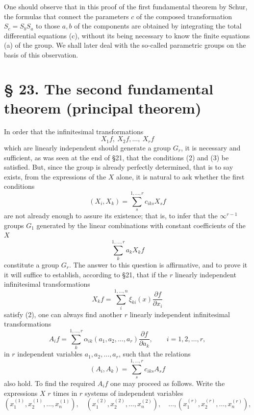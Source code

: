 \documentclass[11pt]{book}
\begin{document}
One should observe that in this proof of the first fundamental theorem by Schur, the formulas that connect the parameters $c$ of the composed transformation $S_c=S_bS_a$ to those $a,b$ of the components are obtained by integrating the total differential equations (c), without its being necessary to know the finite equations (a) of the group. We shall later deal with the so-called parametric groups on the basis of this observation.

\section*{\S{} 23. The second fundamental theorem (principal theorem)}

In order that the infinitesimal transformations
\[
 X_1f,\ X_2f,\ldots,\ X_rf
\]
which are linearly independent should generate a group $G_r$, it is necessary and sufficient, as was seen at the end of \S{}21, that the conditions (2) and (3) be satisfied. But, since the group is already perfectly determined, that is to say exists, from the expressions of the $X$ alone, it is natural to ask whether the first conditions
\begin{equation*}\tag{2}
 (X_i,X_k)=\sum\limits_s^{1,\ldots,r} c_{iks}X_s f
\end{equation*}
are not already enough to assure its existence; that is, to infer that the $\infty^{r-1}$ groups $G_1$ generated by the linear combinations with constant coefficients of the $X$
\[
 \sum\limits_k^{1,\ldots,r} a_kX_kf
\]
constitute a group $G_r$. The answer to this question is affirmative, and to prove it it will suffice to establish, according to \S{}21, that if the $r$ linearly independent infinitesimal transformations
\begin{equation*}\tag{2*}
 X_kf=\sum\limits_i^{1,\ldots,n}\xi_{ki}(x)\frac{\partial f}{\partial x_i}
\end{equation*}
satisfy (2), one can always find another $r$ linearly independent infinitesimal transformations
\[
 A_if=\sum\limits_k^{1,\ldots,r}\alpha_{ik}(a_1,a_2,\ldots,a_r)
        \frac{\partial f}{\partial a_k},
 \qquad i=1,2,\ldots,r,
\]
in $r$ independent variables $a_1,a_2,\ldots,a_r$, such that the relations
\begin{equation*}\tag{3}
 (A_i,A_k)=\sum\limits_s^{1,\ldots,r}c_{iks}A_s f
\end{equation*}
also hold. To find the required $A_if$ one may proceed as follows. Write the expressions $X$ $r$ times in $r$ systems of independent variables
\[
 (x^{(1)}_1,x^{(1)}_2,\ldots,x^{(1)}_n),\quad
 (x^{(2)}_1,x^{(2)}_2,\ldots,x^{(2)}_n),\quad \ldots,
 (x^{(r)}_1,x^{(r)}_2,\ldots,x^{(r)}_n),
\]
\end{document}
